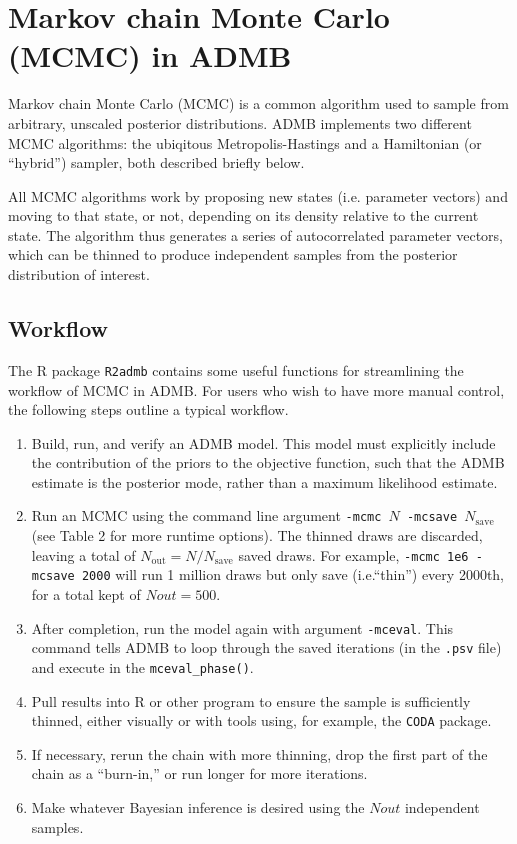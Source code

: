 \documentclass{article}\usepackage[]{graphicx}\usepackage[]{color}
\begin{document}
\section{Markov chain Monte Carlo (MCMC) in ADMB}
Markov chain Monte Carlo (MCMC) is a common algorithm used
to sample from arbitrary, unscaled posterior
distributions. ADMB implements two different MCMC
algorithms: the ubiqitous Metropolis-Hastings and a
Hamiltonian (or ``hybrid'') sampler, both described briefly
below.

All MCMC algorithms work by proposing new states
(i.e. parameter vectors) and moving to that state, or not,
depending on its density relative to the current state. The
algorithm thus generates a series of autocorrelated parameter
vectors, which can be thinned to produce independent samples
from the posterior distribution of interest.

\subsection{Workflow}
The R package \texttt{R2admb} contains some useful functions
for streamlining the workflow of MCMC in ADMB. For users who
wish to have more manual control, the following steps
outline a typical workflow.
\begin{enumerate}
\item Build, run, and verify an ADMB model. This model must
  explicitly include the contribution of the priors to the
  objective function, such that the ADMB estimate is the
  posterior mode, rather than a maximum likelihood estimate.
\item Run an MCMC using the command line argument
  \texttt{-mcmc $N$ -mcsave $N_{\text{save}}$} (see Table 2 
  for more runtime options). The thinned draws are discarded,
  leaving a total of $N_{\text{out}}=N/N_{\text{save}}$
  saved draws. For example, \texttt{-mcmc 1e6 -mcsave 2000}
  will run 1 million draws but only save (i.e.``thin'')
  every 2000th, for a total kept of $Nout=500$.
\item After completion, run the model again with argument
  \texttt{-mceval}. This command tells ADMB to loop through
  the saved iterations (in the \texttt{.psv} file) and
  execute in the \texttt{mceval\_phase()}.
\item Pull results into R or other program to ensure the
  sample is sufficiently thinned, either visually or with
  tools using, for example, the \texttt{CODA} package.
\item If necessary, rerun the chain with more thinning, drop
  the first part of the chain as a ``burn-in,'' or run
  longer for more iterations.
\item Make whatever Bayesian inference is desired using the
  $Nout$ independent samples.
\end{enumerate}
\end{document}
